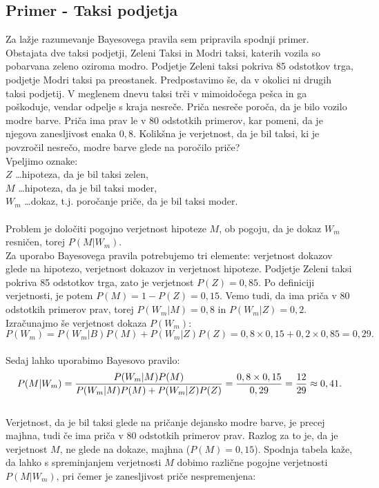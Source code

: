 \documentclass[12pt,a4paper]{amsart}
\theoremstyle{definition} %
\theoremstyle{plain} %
\begin{document}
\subsection{Primer - Taksi podjetja}
Za lažje razumevanje Bayesovega pravila sem pripravila spodnji primer. \\
Obstajata dve taksi podjetji, Zeleni Taksi in Modri taksi, katerih vozila so pobarvana zeleno oziroma modro. Podjetje Zeleni taksi pokriva
85 odstotkov trga, podjetje Modri taksi pa preostanek. Predpostavimo še, da v okolici ni drugih taksi podjetij. V meglenem dnevu taksi trči
v mimoidočega pešca in ga poškoduje, vendar odpelje s kraja nesreče. Priča nesreče poroča, da je bilo vozilo modre barve. Priča ima prav le
v 80 odstotkih primerov, kar pomeni, da je njegova zanesljivost enaka $0,8$. Kolikšna je verjetnost, da je bil taksi, ki je povzročil nesrečo,
modre barve glede na poročilo priče? \\
Vpeljimo oznake:\\
$Z$ \dots hipoteza, da je bil taksi zelen, \\
$M$ \dots hipoteza, da je bil taksi moder, \\
$W_m$ \dots dokaz, t.j. poročanje priče, da je bil taksi moder. \\ \\
Problem je določiti pogojno verjetnost hipoteze $M$, ob pogoju, da je dokaz $W_m$ resničen, torej $P(M \lvert W_m)$. \\
Za uporabo Bayesovega pravila potrebujemo tri elemente: verjetnost dokazov glede na hipotezo, verjetnost dokazov in verjetnost hipoteze. Podjetje
Zeleni taksi pokriva 85 odstotkov trga, zato je verjetnost $P(Z)=0,85$. Po definiciji verjetnosti, je potem $P(M)=1-P(Z)=0,15$. Vemo tudi, da ima
priča v 80 odstotkih primerov prav, torej $P(W_m \lvert M) = 0,8$ in $P(W_m \lvert Z) = 0,2$. Izračunajmo še verjetnost dokaza $P(W_m)$:\\
\[P(W_m) = P(W_m \lvert B)P(M) + P(W_m \lvert Z)P(Z)= 0,8 \times 0,15 + 0,2 \times 0,85 = 0,29.\]\\
Sedaj lahko uporabimo Bayesovo pravilo:
\[
    P(M \lvert W_m)= \frac{P(W_m \lvert M)P(M)}{P(W_m \lvert M)P(M) + P(W_m \lvert Z)P(Z)} = \frac{0,8 \times 0,15}{0,29} = \frac{12}{29} \approx 0,41. \vspace{2mm}
\] \\
Verjetnost, da je bil taksi glede na pričanje dejansko modre barve, je precej majhna, tudi če ima priča v 80 odstotkih primerov prav. Razlog za to je,
da je verjetnost $M$, ne glede na dokaze, majhna ($P(M)=0,15$). Spodnja tabela kaže, da lahko s spreminjanjem verjetnosti $M$ dobimo različne pogojne
verjetnosti $P(M \lvert W_m)$, pri čemer je zanesljivost priče nespremenjena:
\end{document}
